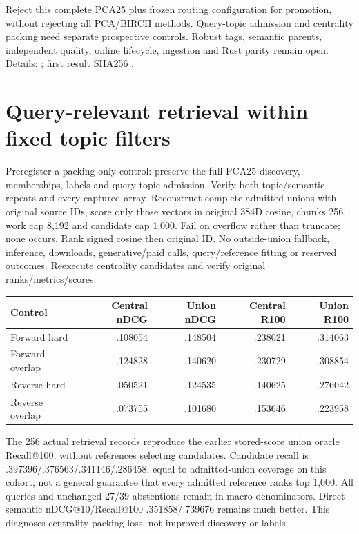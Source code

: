 \documentclass[11pt]{article}
\begin{document}
Reject this complete PCA25 plus frozen routing configuration for promotion,
without rejecting all PCA/BIRCH methods. Query-topic admission and centrality
packing need separate prospective controls. Robust tags, semantic parents,
independent quality, online lifecycle, ingestion and Rust parity remain open.
Details: ; first result
SHA256 .

\section{Query-relevant retrieval within fixed topic filters}
Preregister a packing-only control: preserve the full PCA25 discovery, memberships,
labels and query-topic admission. Verify both topic/semantic repeats and every
captured array. Reconstruct complete admitted unions with original source IDs,
score only those vectors in original 384D cosine, chunks 256, work cap 8,192
and candidate cap 1,000. Fail on overflow rather than truncate; none occurs.
Rank signed cosine then original ID. No outside-union fallback, inference,
downloads, generative/paid calls, query/reference fitting or reserved outcomes.
Reexecute centrality candidates and verify original ranks/metrics/scores.

\begin{center}\small
\begin{tabular}{lrrrr}
\toprule
Control & Central nDCG & Union nDCG & Central R100 & Union R100\\
\midrule
Forward hard & .108054 & .148504 & .238021 & .314063\\
Forward overlap & .124828 & .140620 & .230729 & .308854\\
Reverse hard & .050521 & .124535 & .140625 & .276042\\
Reverse overlap & .073755 & .101680 & .153646 & .223958\\
\bottomrule
\end{tabular}\end{center}
The 256 actual retrieval records reproduce the earlier stored-score union
oracle Recall@100, without references selecting candidates. Candidate recall
is .397396/.376563/.341146/.286458, equal to admitted-union coverage on this
cohort, not a general guarantee that every admitted reference ranks top 1,000.
All queries and unchanged 27/39 abstentions remain in macro denominators.
Direct semantic nDCG@10/Recall@100 .351858/.739676 remains much better.
This diagnoses centrality packing loss, not improved discovery or labels.
\end{document}
